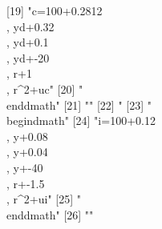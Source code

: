 [19] "{c}=100+0.2812\\, {yd}+0.32\\, {yd}+0.1\\, {yd}+-20\\, {r}+1\\, {r}^{2}+{uc}"                                                                                                                                                                                                                  
[20] "\\end{dmath}"                                                                                                                                                                                                                                                                                  
[21] ""                                                                                                                                                                                                                                                                                              
[22] "%
[23] "\\begin{dmath}"                                                                                                                                                                                                                                                                                
[24] "{i}=100+0.12\\, {y}+0.08\\, {y}+0.04\\, {y}+-40\\, {r}+-1.5\\, {r}^{2}+{ui}"                                                                                                                                                                                                                   
[25] "\\end{dmath}"                                                                                                                                                                                                                                                                                  
[26] ""                                                                                                                                                                                                                                                                                              
